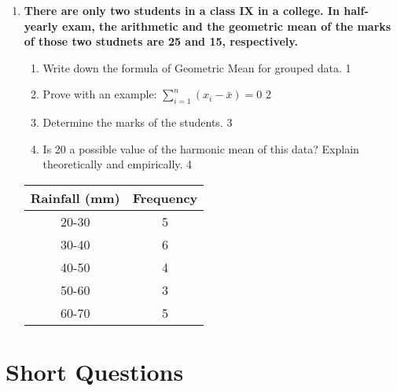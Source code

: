 \documentclass[a4paper,oneside]{book}
\begin{document}
\begin{enumerate}
     \item
	  \textbf{There are only two students in a class IX in a college. In half-yearly exam, the arithmetic and the geometric mean of the marks of those two studnets are 25 and 15, respectively.} 
  
  \begin{enumerate}
    \item
	Write down the formula of Geometric Mean for grouped data. \hfill 1
	\item Prove with an example: $\displaystyle \sum_{i=1}^n (x_i-\bar x) = 0$ \hfill 2
    \item  
	Determine the marks of the students. \hfill 3
    \item
	Is 20 a possible value of the harmonic mean of this data? Explain theoretically and empirically. \hfill 4
  \end{enumerate}

    \begin{table}[h]
    \centering
\begin{tabular}{c|c}
\textbf{Rainfall (mm)} & \textbf{Frequency} \\ \hline
20-30                  & 5                  \\ \hline
30-40                  & 6                  \\ \hline
40-50                  & 4                  \\ \hline
50-60                  & 3                  \\
60-70                  & 5                 
\end{tabular}
\end{table}
\end{enumerate}

\section{Short Questions}
\end{document}

